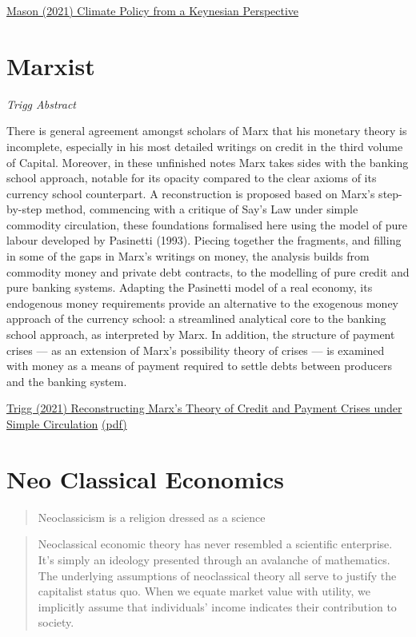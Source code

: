 \documentclass[
]{book}
\begin{document}
\href{http://jwmason.org/slackwire/climate-policy-from-a-keynesian-perspective/}{Mason (2021) Climate Policy from a Keynesian Perspective}

\hypertarget{marxist}{%
\chapter{Marxist}\label{marxist}}

\emph{Trigg Abstract}

There is general agreement amongst scholars of Marx that his
monetary theory is incomplete, especially in his most detailed
writings on credit in the third volume of Capital. Moreover, in
these unfinished notes Marx takes sides with the banking school
approach, notable for its opacity compared to the clear axioms of
its currency school counterpart. A reconstruction is proposed
based on Marx's step-by-step method, commencing with a
critique of Say's Law under simple commodity circulation, these
foundations formalised here using the model of pure labour
developed by Pasinetti (1993). Piecing together the fragments,
and filling in some of the gaps in Marx's writings on money, the
analysis builds from commodity money and private debt
contracts, to the modelling of pure credit and pure banking
systems. Adapting the Pasinetti model of a real economy, its
endogenous money requirements provide an alternative to the
exogenous money approach of the currency school: a
streamlined analytical core to the banking school approach, as
interpreted by Marx. In addition, the structure of payment crises
--- as an extension of Marx's possibility theory of crises --- is
examined with money as a means of payment required to settle
debts between producers and the banking system.

\href{https://doi.org/10.1080/09538259.2021.1897751}{Trigg (2021) Reconstructing Marx's Theory of Credit and Payment Crises under Simple Circulation}
\href{pdf/Trigg_2021_Marx_Credit_Theory.pdf}{(pdf)}

\hypertarget{neo-classical-economics}{%
\chapter{Neo Classical Economics}\label{neo-classical-economics}}

\begin{quote}
Neoclassicism is a religion dressed as a science
\end{quote}

\begin{quote}
Neoclassical economic theory has never resembled a scientific enterprise. It's simply an ideology presented through an avalanche of mathematics. The underlying assumptions of neoclassical theory all serve to justify the capitalist status quo. When we equate market value with utility, we implicitly assume that individuals' income indicates their contribution to society.
\end{quote}
\end{document}
